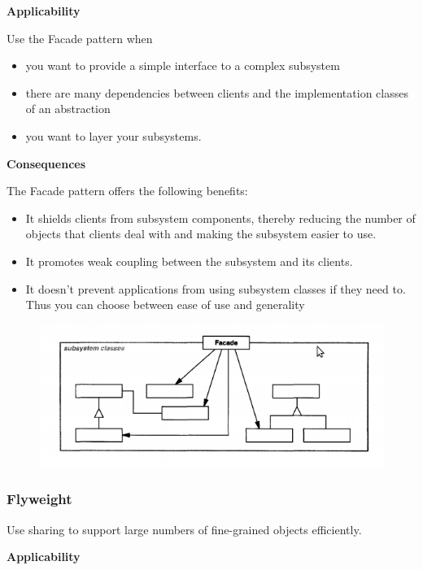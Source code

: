 \documentclass{article}
\begin{document}
\textbf{Applicability}

Use the Facade pattern when
\begin{itemize}
    \item you want to provide a simple interface to a complex subsystem
    \item there are many dependencies between clients and the implementation classes of an abstraction
    \item you want to layer your subsystems.
\end{itemize}

\textbf{Consequences}

The Facade pattern offers the following benefits:
\begin{itemize}
    \item It shields clients from subsystem components, thereby reducing the number of objects that clients deal with and making the subsystem easier to use.
    \item It promotes weak coupling between the subsystem and its clients.
    \item It doesn't prevent applications from using subsystem classes if they need to. Thus you can choose between ease of use and generality
\end{itemize}

\begin{figure}[h]
    \centering
    \includegraphics[width=14cm]{diagrams/pattern-10-facade.png}
\end{figure}

\newpage
\subsubsection{Flyweight}
Use sharing to support large numbers of fine-grained objects efficiently.

\textbf{Applicability}
\end{document}
